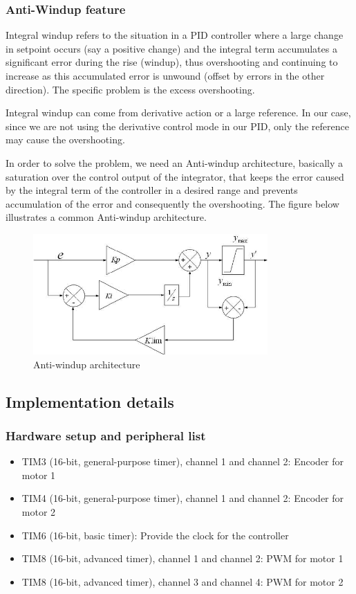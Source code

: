 \documentclass[english]{article}
\begin{document}
\subsubsection{Anti-Windup feature}
Integral windup refers to the situation in a PID controller where a large change in setpoint occurs (say a positive change) and the integral term accumulates a significant error during the rise (windup), thus overshooting and continuing to increase as this accumulated error is unwound (offset by errors in the other direction). The specific problem is the excess overshooting. 

Integral windup can come from derivative action or a large reference. In our case, since we are not using the derivative control mode in our PID, only the reference may cause the overshooting.  

In order to solve the problem, we need an Anti-windup architecture, basically a saturation over the control output of the integrator, that keeps the error caused by the integral term of the controller in a desired range and prevents accumulation of the error and consequently the overshooting. The figure below illustrates a common Anti-windup architecture. 
\begin{figure}[!h]
    \centering
    \includegraphics[width=0.80\textwidth, height=0.25\textheight]{figures/windup.png}
    \caption{Anti-windup architecture}
    \label{fig:pid}
\end{figure}
\subsection{Implementation details}
\subsubsection{Hardware setup and peripheral list}
\begin{itemize}
    \item TIM3 (16-bit, general-purpose timer), channel 1 and channel 2: Encoder for motor 1  
    \item TIM4 (16-bit, general-purpose timer), channel 1 and channel 2: Encoder for motor 2 
    \item TIM6 (16-bit, basic timer): Provide the clock for the controller 
    \item TIM8 (16-bit, advanced timer), channel 1 and channel 2: PWM for motor 1 
    \item TIM8 (16-bit, advanced timer), channel 3 and channel 4: PWM for motor 2 
\end{itemize}
\end{document}
